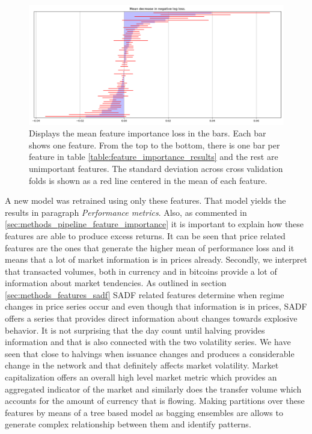 \begin{figure}[H]
    \centering
    \includegraphics[width=1.35\textwidth, height=\textheight, keepaspectratio, angle=90]{results/images/feat_importance.png}
    \caption{Displays the mean feature importance loss in the bars. Each bar shows one feature. From the top to the bottom, there is one bar per feature in table \ref{table:feature_importance_results} and the rest are unimportant features. The standard deviation across cross validation folds is shown as a red line centered in the mean of each feature.}
    \label{fig:feat_importance}
\end{figure}

A new model was retrained using only these features. That model yields the results
in paragraph \emph{Performance metrics}. Also, as commented in
\ref{sec:methods_pipeline_feature_importance} it is important to explain how
these features are able to produce excess returns. It can be seen that price
related features are the ones that generate the higher mean of performance loss
and it means that a lot of market information is in prices already. Secondly, we
interpret that transacted volumes, both in currency and in bitcoins provide a lot
of information about market tendencies. As outlined in section \ref{sec:methods_features_sadf}
SADF related features determine when regime changes in price series occur and even
though that information is in prices, SADF offers a series that provides direct
information about changes towards explosive behavior. It is not surprising that
the day count until halving provides information and that is also connected with
the two volatility series. We have seen that close to halvings when
issuance changes and produces a considerable change in the network and that definitely
affects market volatility. Market capitalization offers an overall high level
market metric which provides an aggregated indicator of the market and similarly
does the transfer volume which accounts for the amount of currency that is flowing.
Making partitions over these features by means of a tree based model as bagging
ensembles are allows to generate complex relationship between them and identify
patterns. 

